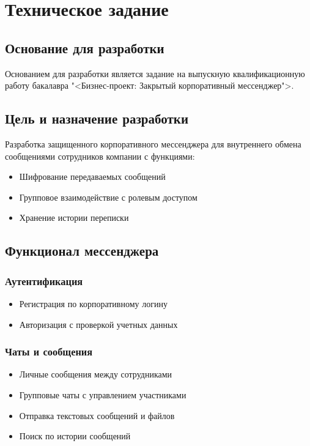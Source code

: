 \section{Техническое задание}
\subsection{Основание для разработки}

Основанием для разработки является задание на выпускную квалификационную работу бакалавра "<Бизнес-проект: Закрытый корпоративный мессенджер">.

\subsection{Цель и назначение разработки}

Разработка защищенного корпоративного мессенджера для внутреннего обмена сообщениями сотрудников компании с функциями:
\begin{itemize}
	\item Шифрование передаваемых сообщений
	\item Групповое взаимодействие с ролевым доступом
	\item Хранение истории переписки
\end{itemize}


\subsection{Функционал мессенджера}

\subsubsection{Аутентификация}
\begin{itemize}
	\item Регистрация по корпоративному логину
	\item Авторизация с проверкой учетных данных
\end{itemize}

\subsubsection{Чаты и сообщения}
\begin{itemize}
	\item Личные сообщения между сотрудниками
	\item Групповые чаты с управлением участниками
	\item Отправка текстовых сообщений и файлов
	\item Поиск по истории сообщений
\end{itemize}

